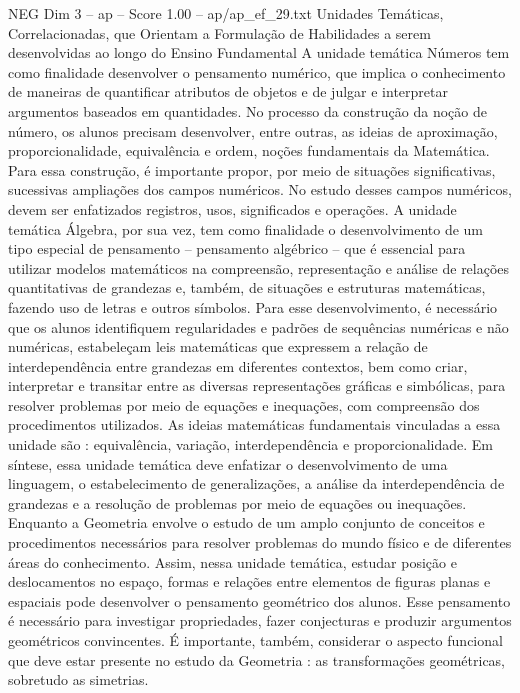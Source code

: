 \begin{textsample}{NEG Dim 3 – ap – Score 1.00 – ap/ap\_ef\_29.txt}  \label{ex:f3_neg_104}
Unidades Temáticas, Correlacionadas, que Orientam a Formulação de Habilidades a serem desenvolvidas ao longo do Ensino Fundamental A unidade temática Números tem como finalidade desenvolver o pensamento numérico, que implica o conhecimento de maneiras de quantificar atributos de objetos e de julgar e interpretar argumentos baseados em quantidades.
No processo da construção da noção de número, os alunos precisam desenvolver, entre outras, as ideias de aproximação, proporcionalidade, equivalência e ordem, noções fundamentais da Matemática.
Para essa construção, é importante propor, por meio de situações significativas, sucessivas ampliações dos campos numéricos.
No estudo desses campos numéricos, devem ser enfatizados registros, usos, significados e operações.
A unidade temática Álgebra, por sua vez, tem como finalidade o desenvolvimento de um tipo especial de pensamento – pensamento algébrico – que é essencial para utilizar modelos matemáticos na compreensão, representação e análise de relações quantitativas de grandezas e, também, de situações e estruturas matemáticas, fazendo uso de letras e outros símbolos.
Para esse desenvolvimento, é necessário que os alunos identifiquem regularidades e padrões de sequências numéricas e não numéricas, estabeleçam leis matemáticas que expressem a relação de interdependência entre grandezas em diferentes contextos, bem como criar, interpretar e transitar entre as diversas representações gráficas e simbólicas, para resolver problemas por meio de equações e inequações, com compreensão dos procedimentos utilizados.
As ideias matemáticas fundamentais vinculadas a essa unidade são : equivalência, variação, interdependência e proporcionalidade.
Em síntese, essa unidade temática deve enfatizar o desenvolvimento de uma linguagem, o estabelecimento de generalizações, a análise da interdependência de grandezas e a resolução de problemas por meio de equações ou inequações.
Enquanto a Geometria envolve o estudo de um amplo conjunto de conceitos e procedimentos necessários para resolver problemas do mundo físico e de diferentes áreas do conhecimento.
Assim, nessa unidade temática, estudar posição e deslocamentos no espaço, formas e relações entre elementos de figuras planas e espaciais pode desenvolver o pensamento geométrico dos alunos.
Esse pensamento é necessário para investigar propriedades, fazer conjecturas e produzir argumentos geométricos convincentes.
É importante, também, considerar o aspecto funcional que deve estar presente no estudo da Geometria : as transformações geométricas, sobretudo as simetrias.

\end{textsample}
